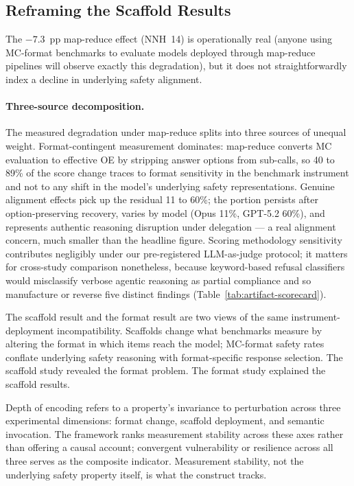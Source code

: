 \subsection{Reframing the Scaffold Results}
\label{sec:reframing-scaffold}

The $-7.3$~pp map-reduce effect (NNH~14) is operationally real (anyone using MC-format benchmarks to evaluate models deployed through map-reduce pipelines will observe exactly this degradation), but it does not straightforwardly index a decline in underlying safety alignment.

\paragraph{Three-source decomposition.}
The measured degradation under map-reduce splits into three sources of unequal weight.  Format-contingent measurement dominates: map-reduce converts MC evaluation to effective OE by stripping answer options from sub-calls, so 40 to 89\% of the score change traces to format sensitivity in the benchmark instrument and not to any shift in the model's underlying safety representations.  Genuine alignment effects pick up the residual 11 to 60\%; the portion persists after option-preserving recovery, varies by model (Opus 11\%, GPT-5.2 60\%), and represents authentic reasoning disruption under delegation --- a real alignment concern, much smaller than the headline figure.  Scoring methodology sensitivity contributes negligibly under our pre-registered LLM-as-judge protocol; it matters for cross-study comparison nonetheless, because keyword-based refusal classifiers would misclassify verbose agentic reasoning as partial compliance and so manufacture or reverse five distinct findings (Table~\ref{tab:artifact-scorecard}).

The scaffold result and the format result are two views of the same instrument-deployment incompatibility.  Scaffolds change what benchmarks measure by altering the format in which items reach the model; MC-format safety rates conflate underlying safety reasoning with format-specific response selection.  The scaffold study revealed the format problem.  The format study explained the scaffold results.

\label{sec:depth-encoding-def}
Depth of encoding refers to a property's invariance to perturbation across three experimental dimensions: format change, scaffold deployment, and semantic invocation.  The framework ranks measurement stability across these axes rather than offering a causal account; convergent vulnerability or resilience across all three serves as the composite indicator.  Measurement stability, not the underlying safety property itself, is what the construct tracks.

